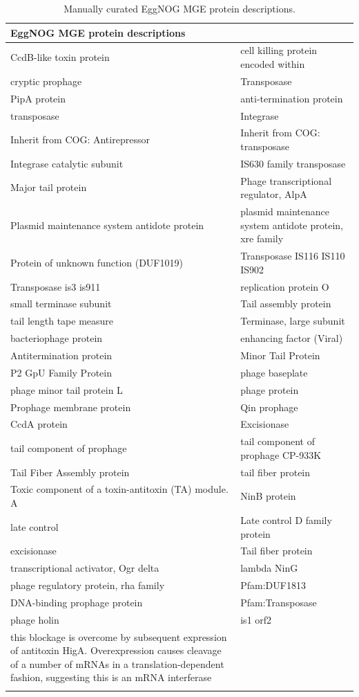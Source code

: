 \begin{footnotesize}
\begin{longtable}{p{7cm}p{7cm}}
    \toprule
EggNOG MGE protein descriptions &\\\midrule
    \endfirsthead
CcdB-like toxin protein & cell killing protein encoded within\\ cryptic prophage & Transposase \\
PipA protein &  anti-termination protein \\
transposase & Integrase \\
Inherit from COG: Antirepressor & Inherit from COG: transposase\\
Integrase catalytic subunit & IS630 family transposase \\
Major tail protein & Phage transcriptional regulator, AlpA \\
Plasmid maintenance system antidote protein & plasmid maintenance system antidote protein, xre family \\
Protein of unknown function (DUF1019) & Transposase IS116 IS110 IS902 \\
Transposase is3 is911 & replication protein O \\
small terminase subunit & Tail assembly protein \\
tail length tape measure & Terminase, large subunit \\
bacteriophage protein & enhancing factor (Viral) \\
Antitermination protein & Minor Tail Protein \\
P2 GpU Family Protein & phage baseplate \\
phage minor tail protein L & phage protein \\
Prophage membrane protein & Qin prophage\\
CcdA protein & Excisionase \\
tail component of prophage & tail component of prophage CP-933K\\
Tail Fiber Assembly protein & tail fiber protein \\
Toxic component of a toxin-antitoxin (TA) module. A & NinB protein\\
late control & Late control D family protein\\
excisionase & Tail fiber protein \\
transcriptional activator, Ogr delta & lambda NinG\\
phage regulatory protein, rha family & Pfam:DUF1813 \\
DNA-binding prophage protein & Pfam:Transposase\\
phage holin & is1 orf2\\
this blockage is overcome by subsequent expression of antitoxin HigA. Overexpression causes cleavage of a number of mRNAs in a translation-dependent fashion, suggesting this is an mRNA interferase\\
\bottomrule
    \caption[Manually curated EggNOG MGE protein descriptions]{Manually curated EggNOG MGE protein descriptions.}
    \label{tab:manual_MGE_terms}
\end{longtable}
\end{footnotesize}



